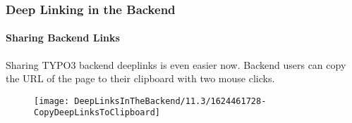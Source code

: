 %

\begin{frame}[fragile]
	\frametitle{Deep Linking in the Backend}
	\framesubtitle{Sharing Backend Links}

	Sharing TYPO3 backend deeplinks is even easier now. Backend users can copy the
	URL of the page to their clipboard with two mouse clicks.

	\begin{figure}
		\texttt{[image: DeepLinksInTheBackend/11.3/1624461728-CopyDeepLinksToClipboard]}
	\end{figure}

\end{frame}


